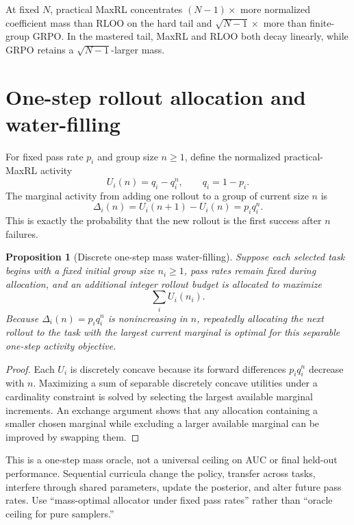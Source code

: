 \documentclass[11pt]{article}
\newtheorem{proposition}[theorem]{Proposition}
\theoremstyle{definition}
\theoremstyle{remark}
\begin{document}
\begin{rewritebox}[title={\textbf{Corrected Figure 1 interpretation}}]
At fixed $N$, practical MaxRL concentrates $(N-1)\times$ more normalized coefficient mass than RLOO on the hard tail and $\sqrt{N-1}\times$ more than finite-group GRPO. In the mastered tail, MaxRL and RLOO both decay linearly, while GRPO retains a $\sqrt{N-1}$-larger mass.
\end{rewritebox}

\section{One-step rollout allocation and water-filling}

For fixed pass rate $p_i$ and group size $n\ge1$, define the normalized practical-MaxRL activity
\[
U_i(n)=q_i-q_i^n,
\qquad q_i=1-p_i.
\]
The marginal activity from adding one rollout to a group of current size $n$ is
\begin{equation}
\Delta_i(n)
=U_i(n+1)-U_i(n)
=p_iq_i^n.
\label{eq:marginal-first-success}
\end{equation}
This is exactly the probability that the new rollout is the first success after $n$ failures.

\begin{proposition}[Discrete one-step mass water-filling]
Suppose each selected task begins with a fixed initial group size $n_i\ge1$, pass rates remain fixed during allocation, and an additional integer rollout budget is allocated to maximize
\[
\sum_i U_i(n_i).
\]
Because $\Delta_i(n)=p_iq_i^n$ is nonincreasing in $n$, repeatedly allocating the next rollout to the task with the largest current marginal is optimal for this separable one-step activity objective.
\end{proposition}

\begin{proof}
Each $U_i$ is discretely concave because its forward differences $p_iq_i^n$ decrease with $n$. Maximizing a sum of separable discretely concave utilities under a cardinality constraint is solved by selecting the largest available marginal increments. An exchange argument shows that any allocation containing a smaller chosen marginal while excluding a larger available marginal can be improved by swapping them.
\end{proof}

\begin{evidencebox}
This is a one-step mass oracle, not a universal ceiling on AUC or final held-out performance. Sequential curricula change the policy, transfer across tasks, interfere through shared parameters, update the posterior, and alter future pass rates. Use ``mass-optimal allocator under fixed pass rates'' rather than ``oracle ceiling for pure samplers.''
\end{evidencebox}
\end{document}
